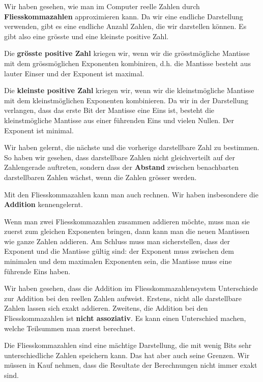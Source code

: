 Wir haben gesehen, wie man im Computer reelle Zahlen durch \textbf{Fliesskommazahlen} approximieren kann. Da wir eine endliche Darstellung verwenden, gibt es eine endliche Anzahl Zahlen, die wir darstellen können. Es gibt also eine grösste und eine kleinste positive Zahl.

Die \textbf{grösste positive Zahl} kriegen wir, wenn wir die grösstmögliche Mantisse mit dem grössmöglichen Exponenten kombiniren, d.h. die Mantisse besteht aus lauter Einser und der Exponent ist maximal.

Die \textbf{kleinste positive Zahl} kriegen wir, wenn wir die kleinstmögliche Mantisse mit dem kleinstmöglichen Exponenten kombinieren. Da wir in der Darstellung verlangen, dass das erste Bit der Mantisse eine Eins ist, besteht die kleinstmögliche Mantisse aus einer führenden Eins und vielen Nullen. Der Exponent ist minimal.

Wir haben gelernt, die nächste und die vorherige darstellbare Zahl zu bestimmen. So haben wir gesehen, dass darstellbare Zahlen nicht gleichverteilt auf der Zahlengerade auftreten, sondern dass der \textbf{Abstand} zwischen benachbarten darstellbaren Zahlen wächst, wenn die Zahlen grösser werden.

Mit den Fliesskommazahlen kann man auch rechnen. Wir haben insbesondere die \textbf{Addition} kennengelernt.

Wenn man zwei Fliesskommazahlen zusammen addieren möchte, muss man sie zuerst zum gleichen Exponenten bringen, dann kann man die neuen Mantissen wie ganze Zahlen addieren. Am Schluss muss man sicherstellen, dass der Exponent und die Mantisse gültig sind: der Exponent muss zwischen dem minimalen und dem maximalen Exponenten sein, die Mantisse muss eine führende Eins haben.

Wir haben gesehen, dass die Addition im Fliesskommazahlensystem Unterschiede zur Addition bei den reellen Zahlen aufweist. Erstens, nicht alle darstellbare Zahlen lassen sich exakt addieren. Zweitens, die Addition bei den Fliesskommazahlen ist \textbf{nicht assoziativ}. Es kann einen Unterschied machen, welche Teilsummen man zuerst berechnet.

Die Fliesskommazahlen sind eine mächtige Darstellung, die mit wenig Bits sehr unterschiedliche Zahlen speichern kann. Das hat aber auch seine Grenzen. Wir müssen in Kauf nehmen, dass die Resultate der Berechnungen nicht immer exakt sind.